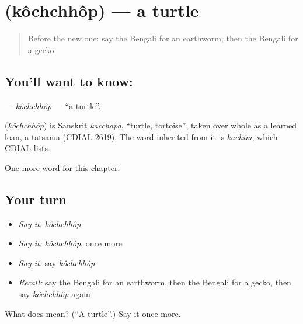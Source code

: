 \section[\texorpdfstring{\bn{কচ্ছপ} (kôchchhôp)}{কচ্ছপ (kôchchhôp)}]{ (kôchchhôp) — a turtle}

\label{lesson:BN-C122-kochchhop}



\begin{quote}
Before the new one: say the Bengali for an earthworm, then the Bengali for a gecko.
\end{quote}

\subsection*{You'll want to know: }
\textbf{} — \emph{kôchchhôp} — \textquotedblleft{}a turtle\textquotedblright{}.

\begin{cousinweb}
\textbf{} (\emph{kôchchhôp}) is Sanskrit \emph{kacchapa}, \textquotedblleft{}turtle, tortoise\textquotedblright{}, taken over whole as a learned loan, a tatsama (CDIAL 2619). The word inherited from it is \emph{kāchim}, which CDIAL lists.
\end{cousinweb}

\begin{grammarlens}[title={What you've built}]
One more word for this chapter.
\end{grammarlens}

\subsection*{Your turn}
\begin{itemize}
\raggedright
  \item \emph{Say it:} \emph{kôchchhôp}
  \item \emph{Say it:} \emph{kôchchhôp}, once more
  \item \emph{Say it:} say \emph{kôchchhôp}
  \item \emph{Recall:} say the Bengali for an earthworm, then the Bengali for a gecko, then say \emph{kôchchhôp} again
\end{itemize}

\begin{tcolorbox}[breakable,colback=teal!4,colframe=teal!35!black,title={Before you move on}]
What does  mean? (\textquotedblleft{}A turtle\textquotedblright{}.) Say it once more.
\end{tcolorbox}
